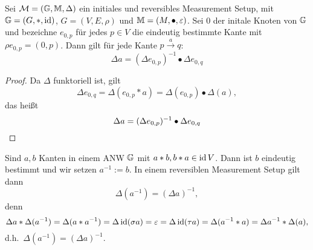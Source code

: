 \newcommand*{\Init}[1][p]{\ensuremath{e_{0, {#1}}}}
\begin{proposition}
    \label{prop:DarstDeltaInitialerKnoten}
    Sei $\mathcal{M} = (\mathbb{G}, \mathbb{M}, \Delta)$ ein initiales und reversibles Measurement Setup,
    mit $\mathbb{G} = (G, *, \operatorname{id})$, $G = (V, E, \rho)$ und $\mathbb{M} = (M, \bullet, \varepsilon)$.
    Sei $0$ der initale Knoten von $\mathbb{G}$ und bezeichne $\Init$ für jedes $p\in V$ die eindeutig bestimmte Kante mit $\rho \Init = (0, p)$.
    Dann gilt für jede Kante $p\xrightarrow{a} q$:
    \[
        \Delta a = (\Delta \Init[p])^{-1}\bullet \Delta \Init[q]
    \]
    \begin{proof}
        Da $\Delta$ funktoriell ist, gilt
        \[
            \Delta\Init[q]
                = \Delta(\Init[p]*a)
                = \Delta(\Init[p])\bullet\Delta(a),
        \]
        das heißt
        \[
            \Delta a = (\Delta\Init[p])^{-1} \bullet \Delta\Init[q]
                \qedhere
        \]
    \end{proof}
\end{proposition}
Sind $a, b$ Kanten in einem ANW $\mathbb{G}$ mit $a*b, b*a\in \operatorname{id} V$.
Dann ist $b$ eindeutig bestimmt und wir setzen $a^{-1} := b$.
In einem reversiblen Measurement Setup gilt dann
\[
    \Delta\left(a^{-1}\right) = (\Delta a)^{-1},
\]
denn
\[
    \Delta a*\Delta(a^{-1})
        = \Delta(a*a^{-1})
        = \Delta\operatorname{id}(\sigma a)
        = \varepsilon
        = \Delta\operatorname{id}(\tau a)
        = \Delta(a^{-1}*a)
        = \Delta a^{-1}*\Delta(a),
\]
d.h.~$\Delta(a^{-1}) = (\Delta a)^{-1}$.

